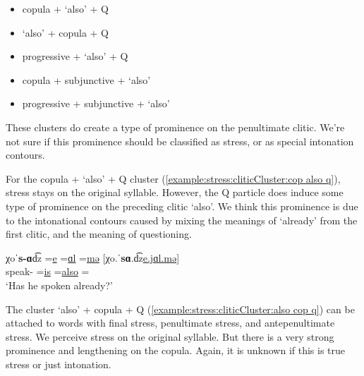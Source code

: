 \begin{itemize}[noitemsep, topsep= 0pt]
	\item  copula + `also' + Q 
	\item `also' + copula + Q 
	\item  progressive + `also' + Q 
	\item  copula + subjunctive + `also' 
	\item  progressive + subjunctive + `also' 
	
\end{itemize}

These clusters do create a type of prominence on the penultimate clitic. We're not sure if this prominence should be classified as stress, or as special intonation contours. 


For the copula + `also' + Q cluster (\ref{example:stress:cliticCluster:cop also q}), stress stays on the original syllable. However, the Q particle does induce some type of prominence on the preceding clitic `also'. We think this prominence is due to the intonational contours caused by mixing the meanings of `already' from the first clitic, and the meaning of questioning. 

\begin{exe}
	\ex \gll   χoˈ\textbf{s-ɑ}d͡z =\underline{e} =\underline{ɑl} =\underline{mə} [χo.ˈ\textbf{sɑ}.d͡z\underline{e.jɑl.mə}]
	\\
	speak-{\rptcp} =\underline{is} =\underline{also} =\underline{{\q}}
	\\
	\trans `Has he spoken already?'
	\label{example:stress:cliticCluster:cop also q}
	\\
\end{exe}

The cluster `also' + copula + Q (\ref{example:stress:cliticCluster:also cop q}) can be attached to words with final stress, penultimate stress, and antepenultimate stress. We perceive stress on the original syllable. But there is a very strong prominence and lengthening on the copula. Again, it is unknown if this is true stress or just intonation. 


